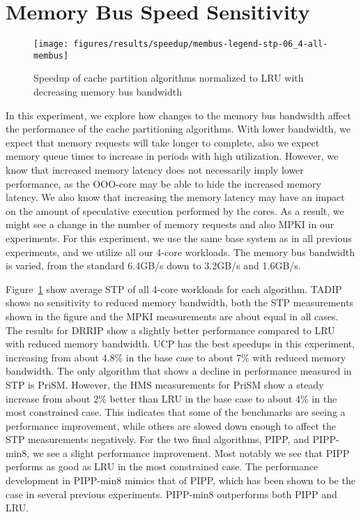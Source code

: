 \section{Memory Bus Speed Sensitivity}
\label{sec:results:bus_sensitivity}


\begin{figure}[t]
    \centering
    \texttt{[image: figures/results/speedup/membus-legend-stp-06\_4-all-membus]}
    \caption[Speedup with decreasing bus bandwidth]{Speedup of cache partition algorithms normalized to LRU with decreasing memory bus bandwidth}
    \label{fig:results:bus}
\end{figure}

In this experiment, we explore how changes to the memory bus bandwidth affect the performance of the cache partitioning algorithms.
With lower bandwidth, we expect that memory requests will take longer to complete, also we expect memory queue times to increase in periods with high utilization.
However, we know that increased memory latency does not necessarily imply lower performance, as the OOO-core may be able to hide the increased memory latency.
We also know that increasing the memory latency may have an impact on the amount of speculative execution performed by the cores.
As a result, we might see a change in the number of memory requests and also MPKI in our experiments.
For this experiment, we use the same base system as in all previous experiments, and we utilize all our 4-core workloads.
The memory bus bandwidth is varied, from the standard 6.4GB/s down to 3.2GB/s and 1.6GB/s.

Figure~\ref{fig:results:bus} show average STP of all 4-core workloads for each algorithm.
TADIP shows no sensitivity to reduced memory bandwidth, both the STP measurements shown in the figure and the MPKI measurements are about equal in all cases.
The results for DRRIP show a slightly better performance compared to LRU with reduced memory bandwidth.
UCP has the best speedups in this experiment, increasing from about 4.8\% in the base case to about 7\% with reduced memory bandwidth.
The only algorithm that shows a decline in performance measured in STP is PriSM.
However, the HMS measurements for PriSM show a steady increase from about 2\% better than LRU in the base case to about 4\% in the most constrained case.
This indicates that some of the benchmarks are seeing a performance improvement, while others are slowed down enough to affect the STP measurements negatively.
For the two final algorithms, PIPP, and PIPP-min8, we see a slight performance improvement.
Most notably we see that PIPP performs as good as LRU in the most constrained case.
The performance development in PIPP-min8 mimics that of PIPP, which has been shown to be the case in several previous experiments.
PIPP-min8 outperforms both PIPP and LRU.

